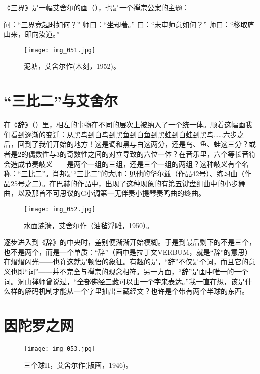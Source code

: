 《三界》是一幅艾舍尔的画（），也是一个禅宗公案的主题：

\begin{zenkoan}
问：“三界竞起时如何？”
师曰：“坐却著。”
曰：“未审师意如何？”
师曰：“移取庐山来，即向汝道。”
\end{zenkoan}

\begin{figure}
\texttt{[image: img\_051.jpg]}
\caption[泥塘，艾舍尔作。]
  {泥塘，艾舍尔作(木刻，1952)。}
\end{figure}

\section{“三比二”与艾舍尔}

在《辞》（）里，相左的事物在不同的层次上被纳入了一个统一体。顺着这幅画我们看到逐渐的变迁：从黑鸟到白鸟到黑鱼到白鱼到黑蛙到白蛙到黑鸟……六步之后，回到了我们开始的地方！这是调和黑与白这两分，还是鸟、鱼、蛙这三分？或者是$2$的偶数性与$3$的奇数性之间的对立导致的六位一体？在音乐里，六个等长音符会造成节奏岐义——是两个一组的三组，还是三个一组的两组？这种岐义有个名称：“三比二”。肖邦是“三比二”的大师：见他的华尔兹（作品42号）、练习曲（作品25号之二）。在巴赫的作品中，出现了这种现象的有第五键盘组曲中的小步舞曲，以及那首不可思议的G小调第一无伴奏小提琴奏鸣曲的终曲。

\begin{figure}
\texttt{[image: img\_052.jpg]}
\caption[水面涟漪，艾舍尔作。]
  {水面涟漪，艾舍尔作（油毡浮雕，1950）。}
\end{figure}

逐步进入到《辞》的中央时，差别便渐渐开始模糊。于是到最后剩下的不是三个，也不是两个，而是一个单质：“辞”（画中是拉丁文VERBUM，就是“辞”的意思）在熠熠闪光——也许这就是顿悟的象征。有趣的是，“辞”不仅是个词，而且它的意义也即“词”——并不完全与禅宗的观念相符。另一方面，“辞”是画中唯一的一个词。洞山禅师曾说过，“全部佛经三藏可以由一个字来表达。”我一直在想，该是什么样的解码机制才能从一个字里抽出三藏经文？也许是个带有两个半球的东西。

\section{因陀罗之网}

\begin{figure}
\texttt{[image: img\_053.jpg]}
\caption[三个球II，艾舍尔作。]
  {三个球II，艾舍尔作(版画，1946)。}
\end{figure}

